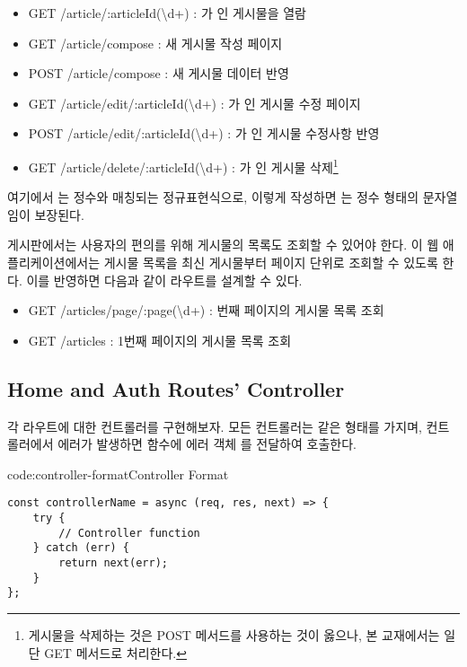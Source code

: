 \begin{itemize}
    \item GET /article/:articleId(\textbackslash{}d+) : 가 인 게시물을 열람
    \item GET /article/compose : 새 게시물 작성 페이지
    \item POST /article/compose : 새 게시물 데이터 반영
    \item GET /article/edit/:articleId(\textbackslash{}d+) : 가 인 게시물 수정 페이지
    \item POST /article/edit/:articleId(\textbackslash{}d+) : 가 인 게시물 수정사항 반영
    \item GET /article/delete/:articleId(\textbackslash{}d+) : 가 인 게시물 삭제\footnote{게시물을 삭제하는 것은 POST 메서드를 사용하는 것이 옳으나, 본 교재에서는 일단 GET 메서드로 처리한다.}
\end{itemize}

여기에서 는 정수와 매칭되는 정규표현식으로, 이렇게 작성하면 는 정수 형태의 문자열임이 보장된다.

게시판에서는 사용자의 편의를 위해 게시물의 목록도 조회할 수 있어야 한다. 이 웹 애플리케이션에서는 게시물 목록을 최신 게시물부터 페이지 단위로 조회할 수 있도록 한다. 이를 반영하면 다음과 같이 라우트를 설계할 수 있다.

\begin{itemize}
    \item GET /articles/page/:page(\textbackslash{}d+) : 번째 페이지의 게시물 목록 조회
    \item GET /articles : 1번째 페이지의 게시물 목록 조회
\end{itemize}

\subsection*{Home and Auth Routes' Controller}

각 라우트에 대한 컨트롤러를 구현해보자. 모든 컨트롤러는 \와 같은 형태를 가지며, 컨트롤러에서 에러가 발생하면  함수에 에러 객체 를 전달하여 호출한다.

\begin{codeenv}{code:controller-format}{Controller Format}\begin{verbatim}
const controllerName = async (req, res, next) => {
    try {
        // Controller function
    } catch (err) {
        return next(err);
    }
};
\end{verbatim}
\end{codeenv}

